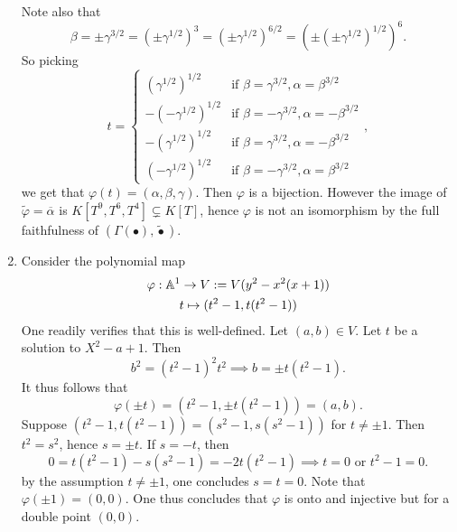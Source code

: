\begin{example}
\begin{enumerate}
            Note also that 
            $$\beta = \pm \gamma^{3/2} =(\pm \gamma^{1/2})^3=(\pm \gamma^{1/2})^{6/2}=(\pm( \pm \gamma^{1/2})^{1/2})^6.$$ 
            So picking 
            $$ t= \begin{cases}
                (\gamma^{1/2})^{1/2} & \text{if } \beta = \gamma^{3/2}, \alpha = \beta^{3/2}\\
                -(-\gamma^{1/2})^{1/2} & \text{if } \beta = -\gamma^{3/2}, \alpha = -\beta^{3/2}\\
                -(\gamma^{1/2})^{1/2} & \text{if } \beta = \gamma^{3/2}, \alpha = -\beta^{3/2}\\
                (-\gamma^{1/2})^{1/2}& \text{if } \beta = -\gamma^{3/2}, \alpha = \beta^{3/2}
            \end{cases},
            $$
            we get that $\varphi(t)=(\alpha,\beta,\gamma).$ Then $\varphi$ is a bijection. However the image of $\widetilde{\varphi}=\overline{\alpha}$ is $K[T^9,T^6,T^4]\subsetneq K[T]$, hence $\varphi$ is not an isomorphism by the full faithfulness of $(\Gamma(\bullet),\widetilde{\bullet})$.
        \item Consider the polynomial map 
        \begin{gather*}
            \varphi: \mathbb{A}^1 \rightarrow V:= V(y^2-x^2(x+1))\\
            t \mapsto (t^2-1,t(t^2-1))
        \end{gather*}
        One readily verifies that this is well-defined. Let $(a,b)\in V$. Let $t$ be a solution to $X^2-a+1$. Then 
        $$b^2 = (t^2-1)^2t^2 \implies b = \pm t(t^2-1).$$
        It thus follows that 
        $$\varphi(\pm t) = (t^2-1,\pm t(t^2-1))= (a,b).$$
        Suppose $(t^2-1,t(t^2-1))=(s^2-1,s(s^2-1))$ for $t\neq \pm 1$. Then $t^2=s^2$, hence $s=\pm t$. If $s=-t$, then 
        $$0 = t(t^2-1)-s(s^2-1)= -2t(t^2-1) \implies t=0 \text{ or } t^2-1 =0.$$
        by the assumption $t\neq \pm 1$, one concludes $s=t = 0$. Note that $\varphi(\pm 1)= (0,0)$. One thus concludes that $\varphi$ is onto and injective but for a double point $(0,0)$.
    \end{enumerate}
\end{example}
